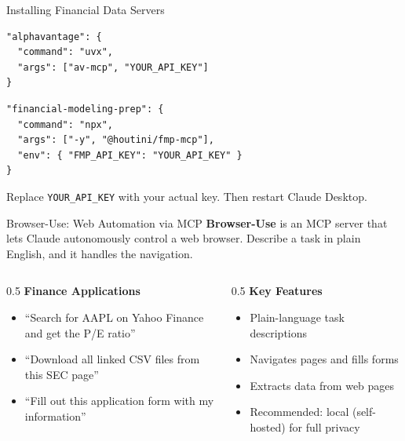 \documentclass[aspectratio=169]{beamer}
\begin{document}
\begin{frame}[fragile]{Installing Financial Data Servers}
\begin{shadedbox}[title=\textbf{Alpha Vantage}]
\begin{verbatim}
"alphavantage": {
  "command": "uvx",
  "args": ["av-mcp", "YOUR_API_KEY"]
}
\end{verbatim}
\end{shadedbox}
\vspace{0.2cm}
\begin{shadedbox}[title=\textbf{Financial Modeling Prep}]
\begin{verbatim}
"financial-modeling-prep": {
  "command": "npx",
  "args": ["-y", "@houtini/fmp-mcp"],
  "env": { "FMP_API_KEY": "YOUR_API_KEY" }
}
\end{verbatim}
\end{shadedbox}
\vspace{0.2cm}
\begin{center}\small
Replace \texttt{YOUR\_API\_KEY} with your actual key. Then restart Claude Desktop.
\end{center}
\end{frame}

\begin{frame}{Browser-Use: Web Automation via MCP}
\textbf{Browser-Use} is an MCP server that lets Claude autonomously control a web browser. Describe a task in plain English, and it handles the navigation.
\vspace{0.3cm}
\begin{columns}[T]
\begin{column}{0.5\textwidth}
\textbf{Finance Applications}
\begin{itemize}\small
  \item ``Search for AAPL on Yahoo Finance and get the P/E ratio''
  \item ``Download all linked CSV files from this SEC page''
  \item ``Fill out this application form with my information''
\end{itemize}
\end{column}
\begin{column}{0.5\textwidth}
\textbf{Key Features}
\begin{itemize}\small
  \item Plain-language task descriptions
  \item Navigates pages and fills forms
  \item Extracts data from web pages
  \item \alert{Recommended}: local (self-hosted) for full privacy
\end{itemize}
\end{column}
\end{columns}
\end{frame}
\end{document}
